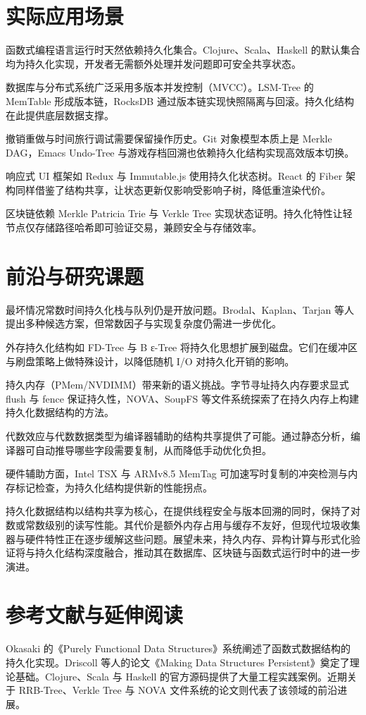 \chapter{实际应用场景}
函数式编程语言运行时天然依赖持久化集合。Clojure、Scala、Haskell 的默认集合均为持久化实现，开发者无需额外处理并发问题即可安全共享状态。\par
数据库与分布式系统广泛采用多版本并发控制（MVCC）。LSM-Tree 的 MemTable 形成版本链，RocksDB 通过版本链实现快照隔离与回滚。持久化结构在此提供底层数据支撑。\par
撤销重做与时间旅行调试需要保留操作历史。Git 对象模型本质上是 Merkle DAG，Emacs Undo-Tree 与游戏存档回溯也依赖持久化结构实现高效版本切换。\par
响应式 UI 框架如 Redux 与 Immutable.js 使用持久化状态树。React 的 Fiber 架构同样借鉴了结构共享，让状态更新仅影响受影响子树，降低重渲染代价。\par
区块链依赖 Merkle Patricia Trie 与 Verkle Tree 实现状态证明。持久化特性让轻节点仅存储路径哈希即可验证交易，兼顾安全与存储效率。\par
\chapter{前沿与研究课题}
最坏情况常数时间持久化栈与队列仍是开放问题。Brodal、Kaplan、Tarjan 等人提出多种候选方案，但常数因子与实现复杂度仍需进一步优化。\par
外存持久化结构如 FD-Tree 与 B ε-Tree 将持久化思想扩展到磁盘。它们在缓冲区与刷盘策略上做特殊设计，以降低随机 I/O 对持久化开销的影响。\par
持久内存（PMem/NVDIMM）带来新的语义挑战。字节寻址持久内存要求显式 flush 与 fence 保证持久性，NOVA、SoupFS 等文件系统探索了在持久内存上构建持久化数据结构的方法。\par
代数效应与代数数据类型为编译器辅助的结构共享提供了可能。通过静态分析，编译器可自动推导哪些字段需要复制，从而降低手动优化负担。\par
硬件辅助方面，Intel TSX 与 ARMv8.5 MemTag 可加速写时复制的冲突检测与内存标记检查，为持久化结构提供新的性能拐点。\par
持久化数据结构以结构共享为核心，在提供线程安全与版本回溯的同时，保持了对数或常数级别的读写性能。其代价是额外内存占用与缓存不友好，但现代垃圾收集器与硬件特性正在逐步缓解这些问题。展望未来，持久内存、异构计算与形式化验证将与持久化结构深度融合，推动其在数据库、区块链与函数式运行时中的进一步演进。\par
\chapter{参考文献与延伸阅读}
Okasaki 的《Purely Functional Data Structures》系统阐述了函数式数据结构的持久化实现。Driscoll 等人的论文《Making Data Structures Persistent》奠定了理论基础。Clojure、Scala 与 Haskell 的官方源码提供了大量工程实践案例。近期关于 RRB-Tree、Verkle Tree 与 NOVA 文件系统的论文则代表了该领域的前沿进展。\par
